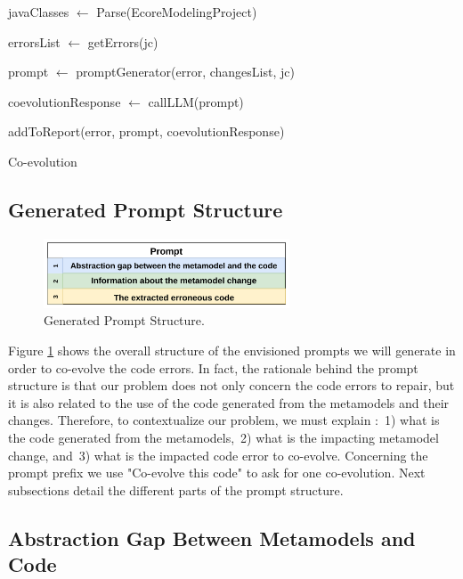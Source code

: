 \begin{algorithm2e}[t]
	\small
	\SetAlgoLined
	javaClasses $\leftarrow$ Parse(EcoreModelingProject)
	
	{
		errorsList $\leftarrow $ getErrors(jc)
		
		{
			prompt $\leftarrow$ promptGenerator(error, changesList, jc)
			
			coevolutionResponse $\leftarrow$ callLLM(prompt)
			
			addToReport(error, prompt, coevolutionResponse)
		}
	}
	
	
	\caption{\LLM Co-evolution}
	\label{algo:overallalgo}
\end{algorithm2e}

\subsection{Generated Prompt Structure}

\begin{figure}[t]
	\centering
	\includegraphics[width=0.65\textwidth]{./pics/chapter3pics/promptTemplate.png}
	\caption{Generated Prompt Structure.}
	\label{fig:promptstructure}
	\vspace{-5mm}
\end{figure}

Figure \ref{fig:promptstructure} shows the overall structure of the envisioned prompts we will generate in order to co-evolve the code errors. In fact, the rationale behind the prompt structure is that our problem does not only concern the code errors to repair, but it is also related to the use of the code generated from the metamodels and their changes. Therefore, to contextualize our problem, we must explain :~1) what is the code generated from the metamodels,~2) what is the impacting metamodel change, and~3) what is the impacted code error to co-evolve.  Concerning the prompt prefix we use "Co-evolve this code" to ask \LLM for one co-evolution. Next subsections detail the different parts of the prompt structure. 

\subsection{Abstraction Gap Between Metamodels and Code}

